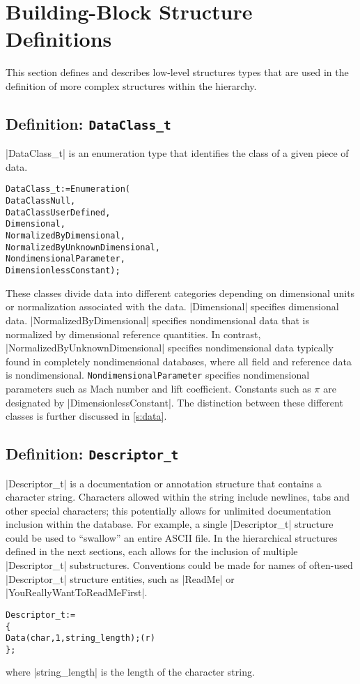 \section{Building-Block Structure Definitions}
\label{s:build}
\thispagestyle{plain}

This section defines and describes low-level structures types that are
used in the definition of more complex structures within the hierarchy.

\subsection{Definition: \texttt{DataClass\_t}}
\label{s:DataClass}

|DataClass_t| is an enumeration type that identifies the class of a given
piece of data. 
\begin{alltt}
  DataClass\_t := Enumeration( 
    DataClassNull, 
    DataClassUserDefined,
    Dimensional,
    NormalizedByDimensional,
    NormalizedByUnknownDimensional,
    NondimensionalParameter,
    DimensionlessConstant ) ;
\end{alltt}
These classes divide data into different categories depending on
dimensional units or normalization associated with the data.
|Dimensional| specifies dimensional data.
|NormalizedByDimensional| specifies nondimensional data that is
normalized by dimensional reference quantities.
In contrast, |NormalizedByUnknownDimensional| specifies nondimensional
data typically found in completely nondimensional databases, where all
field and reference data is nondimensional.
\texttt{NondimensionalParameter} specifies nondimensional parameters
such as Mach number and lift coefficient.
Constants such as $\pi$ are designated by |DimensionlessConstant|.
The distinction between these different classes is further discussed
in \autoref{s:data}.

\subsection{Definition: \texttt{Descriptor\_t}}
\label{s:Descriptor}

|Descriptor_t| is a documentation or annotation structure that contains
a character string.
Characters allowed within the string include newlines, tabs and other
special characters; this potentially allows for unlimited documentation
inclusion within the database.
For example, a single |Descriptor_t| structure could be used to ``swallow''
an entire ASCII file.
In the hierarchical structures defined in the next sections, each allows
for the inclusion of multiple |Descriptor_t| substructures.
Conventions could be made for names of often-used |Descriptor_t|
structure entities, such as |ReadMe| or |YouReallyWantToReadMeFirst|.
\begin{alltt}
  Descriptor\_t :=
    \{
    Data(char, 1, string\_length) ;                                          (r)
    \} ;
\end{alltt}
where |string_length| is the length of the character string.

